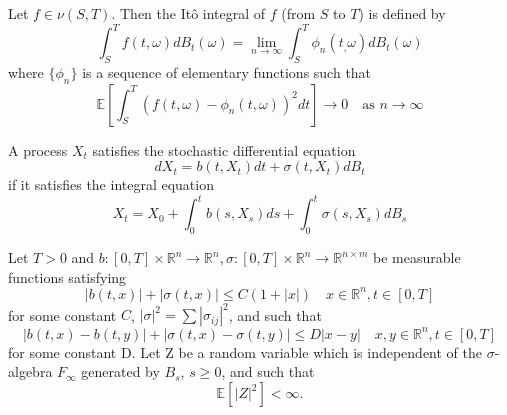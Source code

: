 \documentclass{beamer}
\begin{document}
\begin{frame}
\begin{definition}
	Let $f \in \nu(S,T)$. Then the Itô integral of $f$ (from $S$ to $T$) is defined by
	\begin{equation}
		\int_S^T f(t, \omega)dB_t(\omega) = \lim_{n \to \infty} \int_S^T \phi_n(t_, \omega)dB_t(\omega)
	\end{equation}
	where $\{\phi_n\}$ is a sequence of elementary functions such that
	\begin{equation}
		\mathbb{E}\left[\int_S^T(f(t, \omega) - \phi_n(t, \omega))^2dt\right] \to 0 \quad \text{as } n \to \infty
	\end{equation}
\end{definition}
\end{frame}

\begin{frame}
\begin{definition}
	A process $X_t$ satisfies the stochastic differential equation
	\begin{equation}
		dX_t = b(t, X_t)dt + \sigma(t, X_t)dB_t
	\end{equation}
	if it satisfies the integral equation
	\begin{equation}
		\label{eq:sde}
		X_t = X_0 + \int_0^t b(s, X_s) ds + \int_0^t \sigma (s, X_s) dB_s
	\end{equation}
\end{definition}
\end{frame}

\begin{frame}
\begin{theorem}
	\label{thm:existence}
	Let $T>0$ and $b:[0,T] \times \mathbb{R}^n \to \mathbb{R}^n, \sigma:[0, T] \times \mathbb{R}^n \to \mathbb{R}^{n \times m}$ be measurable functions satisfying
	\begin{equation}
		|b(t, x)| + |\sigma(t, x)| \leq C(1 + |x|) \quad x\in\mathbb{R}^n, t\in [0,T]
	\end{equation}
	for some constant $C$, $|\sigma|^2 = \sum|\sigma_{ij}|^2$, and such that
	\begin{equation}
		|b(t, x) - b(t,y)| + |\sigma(t,x)-\sigma(t,y)| \leq D|x-y| \quad x,y\in \mathbb{R}^n, t\in[0,T]
	\end{equation}
	for some constant D. Let Z be a random variable which is independent of the $\sigma$-algebra $F_\infty$ generated by $B_s$, $s \geq 0$, and such that
	\begin{equation}
		\mathbb{E}[|Z|^2] < \infty.
	\end{equation}
\end{theorem}
\end{frame}
\end{document}
